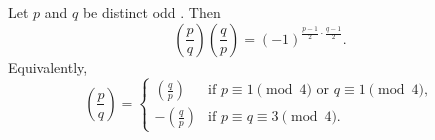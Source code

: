 \begin{theorem} \label{theorem:law_of_quadratic_reciprocity}
    Let $p$ and $q$ be distinct odd . Then
    $$\left(\frac{p}{q}\right) \left(\frac{q}{p}\right) = (-1)^{\frac{p-1}{2} \cdot \frac{q-1}{2}}.$$
    Equivalently,
    $$\left(\frac{p}{q}\right) = \begin{cases}
        \left(\frac{q}{p}\right) & \text{if } p \equiv 1 \pmod{4} \text{ or } q \equiv 1 \pmod{4}, \\
        -\left(\frac{q}{p}\right) & \text{if } p \equiv q \equiv 3 \pmod{4}.
    \end{cases}$$
\end{theorem}
